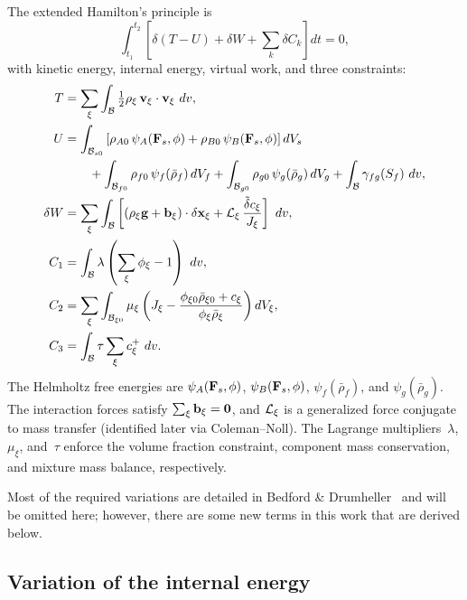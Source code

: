 The extended Hamilton's principle is
\begin{equation*}
  \int_{t_1}^{t_2}\left[\delta(T - U) + \delta W + \sum_k \delta C_k\right] dt = 0,
\end{equation*}
with kinetic energy, internal energy, virtual work, and three constraints:
\begin{align*}
  T &= \sum_\xi \int_{\mathcal{B}} \tfrac{1}{2}\rho_\xi\,\mathbf{v}_\xi\cdot\mathbf{v}_\xi \,\,dv,  \\
  U &= \int_{\mathcal{B}_{s0}} \left[\rho_{A0}\,\psi_A(\mathbf{F}_s, \phi) + \rho_{B0}\,\psi_B(\mathbf{F}_s, \phi)\right] dV_s \\
    &\qquad + \int_{\mathcal{B}_{f0}} \rho_{f0}\,\psi_f(\bar\rho_f)\,dV_f + \int_{\mathcal{B}_{g0}} \rho_{g0}\,\psi_g(\bar\rho_g)\,dV_g + \int_{\mathcal{B}} \gamma_{fg}(S_f)\,\,dv,  \\
  \delta W &= \sum_\xi \int_{\mathcal{B}} \left[(\rho_\xi\mathbf{g} + \mathbf{b}_\xi)\cdot\delta\mathbf{x}_\xi + \mathcal{L}_\xi\,\frac{\tilde\delta c_\xi}{J_\xi}\right] \,\,dv,  \\
  C_1 &= \int_{\mathcal{B}} \lambda\left(\sum_\xi\phi_\xi - 1\right) \,\,dv,  \\
  C_2 &= \sum_\xi \int_{\mathcal{B}_{\xi 0}} \mu_\xi\left(J_\xi - \frac{\phi_{\xi 0}\bar\rho_{\xi 0} + c_\xi}{\phi_\xi\bar\rho_\xi}\right) dV_\xi,  \\
  C_3 &= \int_{\mathcal{B}} \tau\sum_\xi c^+_\xi \,\,dv.
\end{align*}
The Helmholtz free energies are $\psi_A(\mathbf{F}_s, \phi)$, $\psi_B(\mathbf{F}_s, \phi)$, $\psi_f(\bar\rho_f)$, and $\psi_g(\bar\rho_g)$.  The interaction forces satisfy $\sum_\xi \mathbf{b}_\xi = \mathbf{0}$, and $\mathcal{L}_\xi$ is a generalized force conjugate to mass transfer (identified later via Coleman--Noll).  The Lagrange multipliers~$\lambda$, $\mu_\xi$, and~$\tau$ enforce the volume fraction constraint, component mass conservation, and mixture mass balance, respectively.

Most of the required variations are detailed in Bedford \& Drumheller~\cite{drumheller1980thermomechanical} and will be omitted here; however, there are some new terms in this work that are derived below.

\subsection{Variation of the internal energy}

